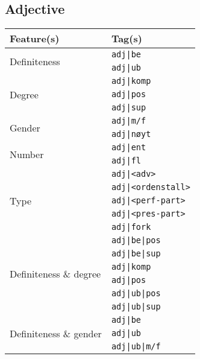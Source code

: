 \documentclass[a4paper,12pt,english]{book}
\begin{document}
\begin{appendices}
    \section{Adjective}
    \begin{table}
        \centering
        \smaller[1]
        \begin{tabular}{@{}ll@{}}
            \toprule
            \textbf{Feature(s)} & \textbf{Tag(s)} \\
            \midrule
            \multirow{2}{*}{Definiteness}
            & \texttt{adj|be} \\
            & \texttt{adj|ub} \\
            \midrule
            \multirow{3}{*}{Degree}
            & \texttt{adj|komp} \\
            & \texttt{adj|pos} \\
            & \texttt{adj|sup} \\
            \midrule
            \multirow{2}{*}{Gender}
            & \texttt{adj|m/f} \\
            & \texttt{adj|nøyt} \\
            \midrule
            \multirow{2}{*}{Number}
            & \texttt{adj|ent} \\
            & \texttt{adj|fl} \\
            \midrule
            \multirow{5}{*}{Type}
            & \texttt{adj|<adv>} \\
            & \texttt{adj|<ordenstall>} \\
            & \texttt{adj|<perf-part>} \\
            & \texttt{adj|<pres-part>} \\
            & \texttt{adj|fork} \\
            \midrule
            \multirow{6}{*}{Definiteness \& degree}
            & \texttt{adj|be|pos} \\
            & \texttt{adj|be|sup} \\
            & \texttt{adj|komp} \\
            & \texttt{adj|pos} \\
            & \texttt{adj|ub|pos} \\
            & \texttt{adj|ub|sup} \\
            \midrule
            \multirow{4}{*}{Definiteness \& gender}
            & \texttt{adj|be} \\
            & \texttt{adj|ub} \\
            & \texttt{adj|ub|m/f} \\

\end{tabular}
\end{table}
\end{appendices}
\end{document}
